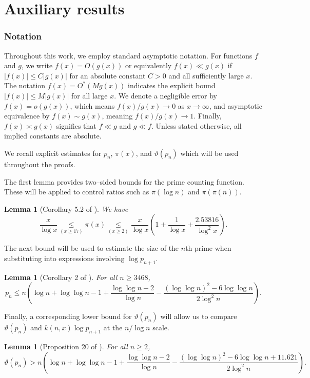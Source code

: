 \documentclass[10pt]{amsart}
\newtheorem{lemma}[theorem]{Lemma}
\theoremstyle{definition} %
\numberwithin{equation}{section}
\begin{document}
\section{Auxiliary results} \label{auxiliary}


\subsubsection*{Notation}
Throughout this work, we employ standard asymptotic notation. For functions $f$ and $g$, we write $f(x) = O(g(x))$ or equivalently $f(x) \ll g(x)$ if $|f(x)| \le C|g(x)|$ for an absolute constant $C>0$ and all sufficiently large $x$. The notation $f(x) = O^*(M g(x))$ indicates the explicit bound $|f(x)| \le M|g(x)|$ for all large $x$. We denote a negligible error by $f(x) = o(g(x))$, which means $f(x)/g(x) \to 0$ as $x \to \infty$, and asymptotic equivalence by $f(x) \sim g(x)$, meaning $f(x)/g(x) \to 1$. Finally, $f(x) \asymp g(x)$ signifies that $f\ll g$ and $g\ll f$. Unless stated otherwise, all implied constants are absolute.

We recall explicit estimates for $p_n$, $\pi(x)$, and $\vartheta(p_n)$ which will be
used throughout the proofs.

\smallskip
The first lemma provides two–sided bounds for the prime counting function.
These will be applied to control ratios such as $\pi(\log n)$ and $\pi(\pi(n))$.

\begin{lemma}[Corollary 5.2 of \cite{b1}]\label{lem:pi}
We have
\[
\frac{x}{\log x} \underset{(x \geq 17)}{\leq} \pi(x)  \underset{(x \geq 2)}{\leq} \frac{x}{\log x} \left( 1 + \frac{1}{\log x} + \frac{2.53816}{\log^{2} x}\right).
\]
\end{lemma}

\smallskip
The next bound will be used to estimate the size of the $n$th prime when 
substituting into expressions involving $\log p_{n+1}$.

\begin{lemma}[Corollary 2 of \cite{alex}]\label{lem:pn}
For all $n \ge 3468$,
\[
p_n \le n \left( \log n + \log \log n -1 + \frac{\log \log n -2}{\log n}
 - \frac{(\log \log n)^2 -6 \log \log n}{2 \log^2 n} \right).
\]
\end{lemma}

\smallskip
Finally, a corresponding lower bound for $\vartheta(p_n)$ will allow us to
compare $\vartheta(p_n)$ and $k(n,x)\log p_{n+1}$ at the $n/\log n$ scale.

\begin{lemma}[Proposition 20 of \cite{alex}]\label{lem:vpn}
For all $n \ge 2$,
\[
\vartheta(p_n) > n \left( \log n + \log \log n -1 + \frac{\log \log n -2}{\log n}
 - \frac{(\log \log n)^2 -6 \log \log n + 11.621}{2 \log^2 n} \right).
\]
\end{lemma}
\end{document}
